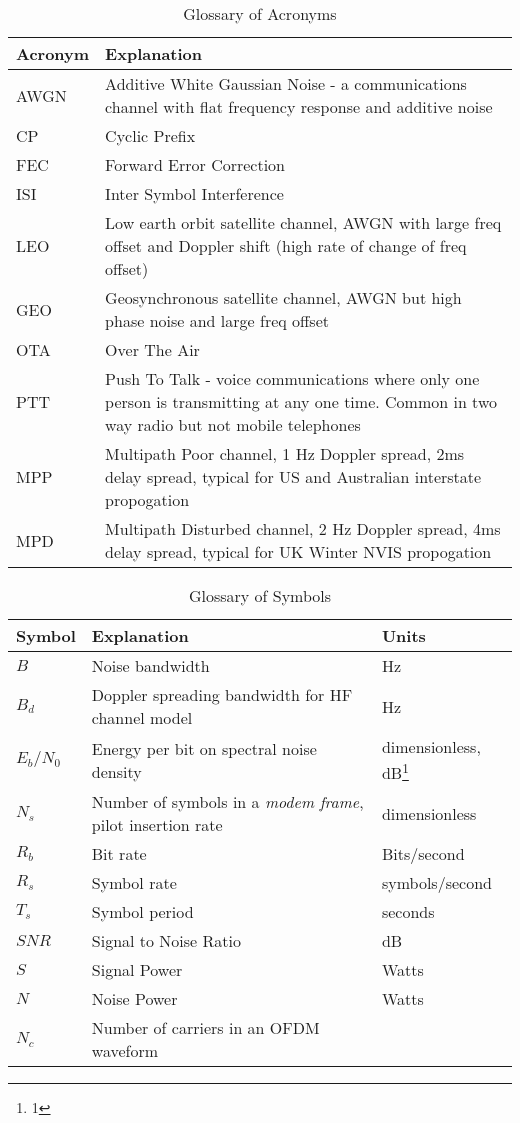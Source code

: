 \documentclass{article}
\begin{document}
\begin{table}[h]
\centering
\begin{tabular}{l p{8cm} }
 \hline
 Acronym & Explanation \\
 \hline
 AWGN & Additive White Gaussian Noise - a communications channel with flat frequency response and additive noise \\
 CP & Cyclic Prefix \\
 FEC & Forward Error Correction \\
 ISI & Inter Symbol Interference \\
 LEO & Low earth orbit satellite channel, AWGN with large freq offset and Doppler shift (high rate of change of freq offset) \\
 GEO & Geosynchronous satellite channel, AWGN but high phase noise and large freq offset \\
 OTA & Over The Air \\
 PTT & Push To Talk - voice communications where only one person is transmitting at any one time.  Common in two way radio but not mobile telephones  \\
 MPP & Multipath Poor channel, 1 Hz Doppler spread, 2ms delay spread, typical for US and Australian interstate propogation \\
 MPD & Multipath Disturbed channel, 2 Hz Doppler spread, 4ms delay spread, typical for UK Winter NVIS propogation \\
 \hline
\end{tabular}
\caption{Glossary of Acronyms}
\end{table}

\begin{table}[h]
\centering
\begin{tabular}{l m{6cm} l}
 \hline
 Symbol & Explanation & Units \\
 \hline
 $B$ & Noise bandwidth & Hz \\
 $B_d$ & Doppler spreading bandwidth for HF channel model & Hz \\
 $E_b/N_0$ & Energy per bit on spectral noise density & dimensionless, dB\footnote{1} \\
 $N_s$ & Number of symbols in a \emph{modem frame}, pilot insertion rate & dimensionless \\
 $R_b$ & Bit rate & Bits/second \\
 $R_s$ & Symbol rate & symbols/second \\
 $T_s$ & Symbol period & seconds \\
 $SNR$ & Signal to Noise Ratio & dB \\
 $S$ & Signal Power & Watts \\
 $N$ & Noise Power & Watts \\
 $N_c$ & Number of carriers in an OFDM waveform \\
 \hline
\end{tabular}
\caption{Glossary of Symbols}
\end{table}
\end{document}
